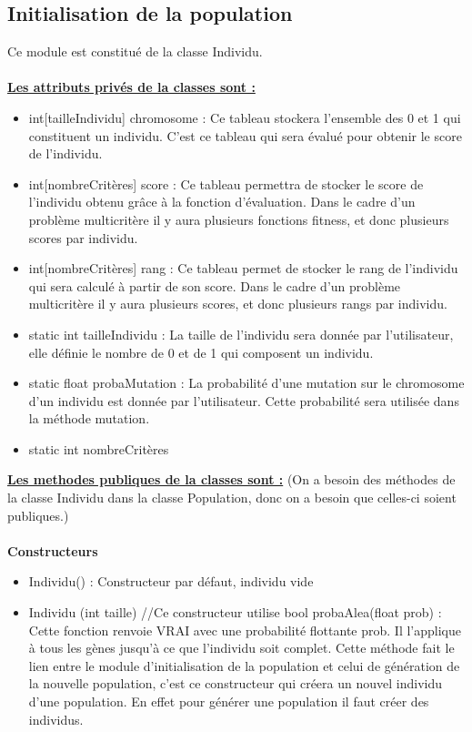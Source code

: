 \documentclass[a4paper,11pt]{article}
\begin{document}
		\subsection{Initialisation de la population}
			Ce module est constitué de la classe Individu.\\
			\\
			\underline{\bf Les attributs privés de la classes sont :}\\
				\begin{itemize}
				\item int[tailleIndividu] chromosome : Ce tableau stockera l’ensemble des 0 et 1 qui constituent un individu. C’est ce tableau qui sera évalué pour obtenir le score de l’individu.
				\item int[nombreCritères] score : Ce tableau permettra de stocker le score de l’individu obtenu grâce à la fonction d’évaluation. 
													Dans le cadre d’un problème multicritère il y aura plusieurs fonctions fitness, et donc plusieurs scores par individu.
				\item int[nombreCritères] rang : Ce tableau permet de stocker le rang de l’individu qui sera calculé à partir de son score. 
													Dans le cadre d’un problème multicritère il y aura plusieurs scores, et donc plusieurs rangs par individu. 
				\item static int tailleIndividu : La taille de l’individu sera donnée par l’utilisateur, elle définie le nombre de 0 et de 1 qui composent un individu.
				\item static float probaMutation : La probabilité d’une mutation sur le chromosome d’un individu est donnée par l’utilisateur. Cette probabilité sera utilisée dans la méthode mutation.
				\item static int nombreCritères\\
			\end{itemize}
			\underline{\bf Les methodes publiques de la classes sont :} (On a besoin des méthodes de la classe Individu dans la classe Population, donc on a besoin que celles-ci soient publiques.)\\\\
			\textbf{Constructeurs}
						\begin{itemize}
							\item Individu() : Constructeur par défaut, individu vide
							\item Individu (int taille) //Ce constructeur utilise bool probaAlea(float prob) : Cette fonction renvoie VRAI avec une probabilité flottante prob.
								Il l’applique à tous les gènes jusqu’à ce que l’individu soit complet.
								Cette méthode fait le lien entre le module d’initialisation de la population et celui de génération de la nouvelle population, c'est ce constructeur qui créera un nouvel individu d'une population. 
								En effet pour générer une population il faut créer des individus. 
						\end{itemize}
\end{document}
